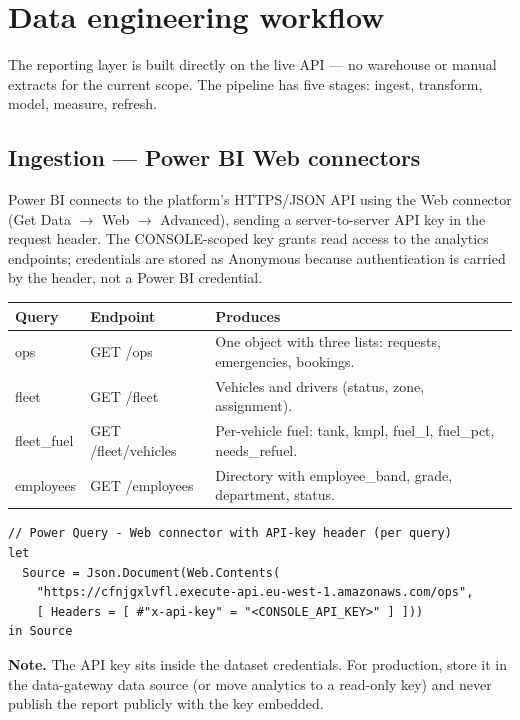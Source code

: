 \documentclass[11pt,a4paper]{article}
\newcommand{\notebox}[1]{%
  \par\vspace{4pt}\noindent
  \colorbox{soft}{\begin{minipage}{\dimexpr\linewidth-2\fboxsep}%
  \color{ink}\small\textbf{Note.} #1\end{minipage}}\par\vspace{6pt}}
\begin{document}
\section{Data engineering workflow}
The reporting layer is built directly on the live API --- no warehouse or manual extracts for
the current scope. The pipeline has five stages: ingest, transform, model, measure, refresh.

\subsection{Ingestion --- Power BI Web connectors}
Power BI connects to the platform's HTTPS/JSON API using the Web connector
(Get Data $\to$ Web $\to$ Advanced), sending a server-to-server API key in the request header.
The CONSOLE-scoped key grants read access to the analytics endpoints; credentials are stored as
Anonymous because authentication is carried by the header, not a Power BI credential.

\begin{tabularx}{\textwidth}{L{0.16\textwidth} L{0.26\textwidth} X}
\toprule
{}\textbf{Query} & \textbf{Endpoint} & \textbf{Produces} \\
\midrule
ops & GET /ops & One object with three lists: requests, emergencies, bookings. \\
fleet & GET /fleet & Vehicles and drivers (status, zone, assignment). \\
fleet\_fuel & GET /fleet/vehicles & Per-vehicle fuel: tank, kmpl, fuel\_l, fuel\_pct, needs\_refuel. \\
employees & GET /employees & Directory with employee\_band, grade, department, status. \\
\bottomrule
\end{tabularx}

\vspace{6pt}
\begin{lstlisting}
// Power Query - Web connector with API-key header (per query)
let
  Source = Json.Document(Web.Contents(
    "https://cfnjgxlvfl.execute-api.eu-west-1.amazonaws.com/ops",
    [ Headers = [ #"x-api-key" = "<CONSOLE_API_KEY>" ] ]))
in Source
\end{lstlisting}

\notebox{The API key sits inside the dataset credentials. For production, store it in the
data-gateway data source (or move analytics to a read-only key) and never publish the report
publicly with the key embedded.}
\end{document}
